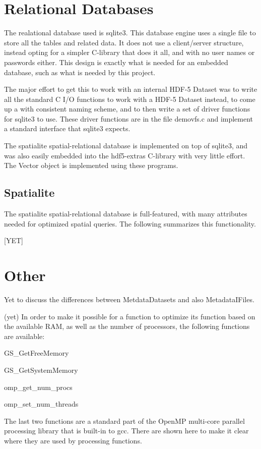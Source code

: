 \hypertarget{vfs_library_object_relational_databases}{}\section{Relational Databases}\label{vfs_library_object_relational_databases}

The realational database used is {\ttfamily sqlite3}. This database engine uses a single file to store all the tables and related data. It does not use a client/server structure, instead opting for a simpler C-\/library that does it all, and with no user names or passwords either. This design is exactly what is needed for an embedded database, such as what is needed by this project.

The major effort to get this to work with an internal H\+D\+F-\/5 Dataset was to write all the standard C I/\+O functions to work with a H\+D\+F-\/5 Dataset instead, to come up a with consistent naming scheme, and to then write a set of driver functions for {\ttfamily sqlite3} to use. These driver functions are in the file {\ttfamily demovfs.\+c} and implement a standard interface that {\ttfamily sqlite3} expects.

The {\ttfamily spatialite} spatial-\/relational database is implemented on top of sqlite3, and was also easily embedded into the hdf5-\/extras C-\/library with very little effort. The Vector object is implemented using these programs.\hypertarget{vfs_library_object_spatialite}{}\subsection{Spatialite}\label{vfs_library_object_spatialite}
The {\ttfamily spatialite} spatial-\/relational database is full-\/featured, with many attributes needed for optimized spatial queries. The following summarizes this functionality.

\mbox{[}Y\+E\+T\mbox{]}\hypertarget{vfs_library_object_other}{}\section{Other}\label{vfs_library_object_other}
Yet to discuss the differences between Metdata\+Datasets and also Metadata\+I\+Files.

(yet) In order to make it possible for a function to optimize its function based on the available R\+A\+M, as well as the number of processors, the following functions are available\+: \begin{DoxyItemize}
\item G\+S\+\_\+\+Get\+Free\+Memory \item G\+S\+\_\+\+Get\+System\+Memory \item omp\+\_\+get\+\_\+num\+\_\+procs \item omp\+\_\+set\+\_\+num\+\_\+threads\end{DoxyItemize}
The last two functions are a standard part of the {\ttfamily Open\+M\+P} multi-\/core parallel processing library that is built-\/in to {\ttfamily gcc}. There are shown here to make it clear where they are used by processing functions.

